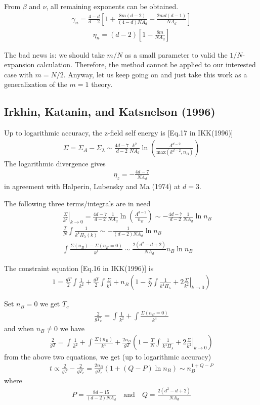 \documentclass[aps,notitlepage]{revtex4-1}
\newcommand{\bea}{\begin{eqnarray}}
\newcommand{\eea}{\end{eqnarray}}
\begin{document}
From $\beta$ and $\nu$, all remaining exponents can be obtained.
\bea \gamma_n=\frac{4-d}{d-2}\left[ 1+\frac{8m(d-2)}{(4-d)NA_d}-\frac{2md(d-1)}{NA_d} \right] \eea
\bea \eta_n=(d-2)\left[1-\frac{8m}{NA_d}\right] \eea


{\color{red} The bad news is: we should take $m/N$ as a small parameter to valid the $1/N$-expansion calculation. Therefore, the method cannot be applied to our interested case with $m=N/2$. Anyway, let us keep going on and just take this work as a generalization of the $m=1$ theory.}

\begin{appendix}
	
\section{Irkhin, Katanin, and Katsnelson (1996)}
Up to logarithmic accuracy, the z-field self energy is [Eq.17 in IKK(1996)]
\bea \Sigma=\Sigma_A-\Sigma_\lambda\sim\frac{4d-7}{d-2}\frac{k^2}{NA_d}\ln\left(\frac{\Lambda^{d-2}}{\mathrm{max}(k^{d-2},n_B)}\right) \eea
The logarithmic divergence gives \bea \eta_z=-\frac{4d-7}{NA_d} \eea in agreement with Halperin, Lubensky and Ma (1974) at $d=3$.

The following three terms/integrals are in need
\bea &&\left.\frac{\Sigma}{k^2}\right|_{k\rightarrow0}=\frac{4d-7}{d-2}\frac{1}{NA_d}\ln\left(\frac{\Lambda^{d-2}}{n_B}\right) \sim -\frac{4d-7}{d-2}\frac{1}{NA_d}\ln n_B \\
&&\frac{T}{N}\int \frac{1}{k^4\Pi_\lambda(k)} \sim -\frac{1}{(d-2)NA_d}\ln n_B \\
&&\int \frac{\Sigma(n_B)-\Sigma(n_B=0)}{k^4} \sim \frac{2(d^2-d+2)}{NA_d} n_B \ln n_B \eea 

The constraint equation [Eq.16 in IKK(1996)] is
\bea 1=\frac{gT}{2}\int\frac{1}{k^2}+\frac{gT}{2}\int\frac{\Sigma}{k^4} + n_B\left(1-\frac{T}{N}\int \frac{1}{k^4\Pi_\lambda} + 2\left.\frac{\Sigma}{k^2}\right|_{k\rightarrow0} \right) \eea

Set $n_B=0$ we get $T_c$
\bea \frac{2}{gT_c}=\int \frac{1}{k^2} + \int \frac{\Sigma(n_B=0)}{k^4} \eea
and when $n_B\ne0$ we have
\bea \frac{2}{gT}=\int \frac{1}{k^2}+\int \frac{\Sigma(n_B)}{k^4} + \frac{2n_B}{gT} \left(1-\frac{T}{N}\int \frac{1}{k^4\Pi_\lambda} + 2\left.\frac{\Sigma}{k^2}\right|_{k\rightarrow0} \right) \eea
from the above two equations, we get (up to logarithmic accuracy)
\bea t\propto\frac{2}{gT}-\frac{2}{gT_c}=\frac{2n_B}{gT_c}\left(1+(Q-P)\ln n_B\right)\sim n_B^{1+Q-P} \eea 
where
\bea P=\frac{8d-15}{(d-2)NA_d} \quad \text{and} \quad Q=\frac{2(d^2-d+2)}{NA_d} \eea 


\end{appendix}
\end{document}
